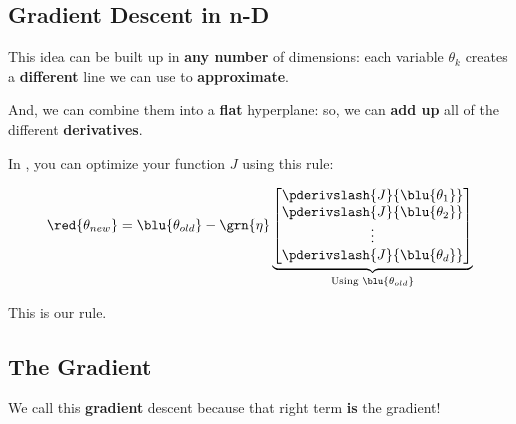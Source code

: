         
    \subsection*{Gradient Descent in n-D}
    
        This idea can be built up in \textbf{any number} of dimensions: each variable $\theta_k$ creates a \textbf{different} line we can use to \textbf{approximate}.
        
        And, we can combine them into a \textbf{flat} hyperplane: so, we can \textbf{add up} all of the different \textbf{derivatives}.\\
        
        \begin{kequation}
            In , you can optimize your function $J$ using this rule:
            
            \begin{equation*}
                \red{ \theta_{new} } =  \blu{ \theta_{old} } 
                - \grn{ \eta } 
                \underbrace{
                    \begin{bmatrix}
                          \pderivslash{J}{ \blu{\theta_1} } \\ 
                          \pderivslash{J}{ \blu{\theta_2} } \\
                          \vdots \\
                          \pderivslash{J}{ \blu{\theta_d} } \\
                    \end{bmatrix}
                }_{ \text{Using } \blu{ \theta_{old} } }
            \end{equation*}
            
            This is our  rule.
        \end{kequation}

    \subsection*{The Gradient}
    
        We call this \textbf{gradient} descent because that right term \textbf{is} the gradient!\\
        
